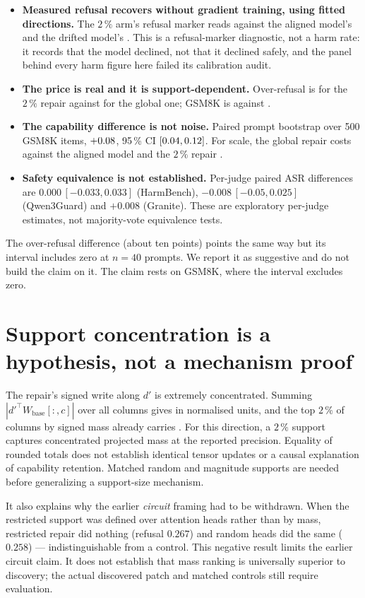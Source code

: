 \documentclass[10pt,a4paper]{article}
\begin{document}
\begin{itemize}
\item \textbf{Measured refusal recovers without gradient training, using fitted directions.} The $2\,\%$ arm's
refusal marker reads \HarmRef{} against the aligned model's \BaseRef{} and the drifted model's \DriftRef.
This is a refusal-marker diagnostic, not a harm rate: it records that the model declined, not that it
declined safely, and the panel behind every harm figure here failed its calibration audit.
\item \textbf{The price is real and it is support-dependent.} Over-refusal is \HarmOver{} for the
$2\,\%$ repair against \GlobOver{} for the global one; GSM8K is \HarmGsm{} against \GlobGsm.
\item \textbf{The capability difference is not noise.} Paired prompt bootstrap over 500 GSM8K items,
$+0.08$, 95\,\% CI $[0.04,0.12]$. For scale, the global repair costs \GlobVsBase{} against the
aligned model and the $2\,\%$ repair \HarmVsBase.
\item \textbf{Safety equivalence is not established.} Per-judge paired ASR differences are
$0.000\,[-0.033,0.033]$ (HarmBench), $-0.008\,[-0.05,0.025]$ (Qwen3Guard) and $+0.008$ (Granite).
These are exploratory per-judge estimates, not majority-vote equivalence tests.
\end{itemize}

The over-refusal difference (about ten points) points the same way but its interval includes zero at
$n=40$ prompts. We report it as suggestive and do not build the claim on it. The claim rests on GSM8K,
where the interval excludes zero.

\section{Support concentration is a hypothesis, not a mechanism proof}\label{sec:mass}

The repair's signed write along $d'$ is extremely concentrated. Summing
$|d'^{\top}W_{\text{base}}[:,c]|$ over all columns gives \MassTotal{} in normalised units, and the top
$2\,\%$ of columns by signed mass already carries \MassTopTwo{}. For this direction, a $2\,\%$
support captures concentrated projected mass at the reported precision. Equality of rounded totals
does not establish identical tensor updates or a causal explanation of capability retention.
Matched random and magnitude supports are needed before generalizing a support-size mechanism.

It also explains why the earlier \emph{circuit} framing had to be withdrawn. When the restricted
support was defined over attention heads rather than by mass, restricted repair did nothing (refusal
$0.267$) and random heads did the same ($0.258$) --- indistinguishable from a control. This negative result limits the earlier circuit claim. It does not establish that mass ranking is
universally superior to discovery; the actual discovered patch and matched controls still require evaluation.
\end{document}
